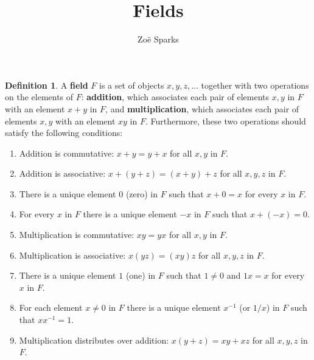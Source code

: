 \documentclass[12pt]{article}
\title{Fields}
\author{Zoë Sparks}
\begin{document}
\theoremstyle{definition}

\newtheorem{thm}{Theorem}
\newtheorem*{nthm}{Theorem}
\newtheorem{sthm}{}[thm]
\newtheorem{lemma}{Lemma}[thm]
\newtheorem*{cor}{Corollary}
\newtheorem*{prop}{Property}
\newtheorem*{defn}{Definition}
\newtheorem*{comm}{Comment}
\newtheorem*{exm}{Example}

\maketitle

\begin{defn}
  A \textbf{field} $F$ is a set of objects $x, y, z, …$ together
  with two operations on the elements of $F$: \textbf{addition},
  which associates each pair of elements $x, y$ in $F$ with an
  element $x + y$ in $F$, and \textbf{multiplication}, which
  associates each pair of elements $x, y$ with an element $xy$ in
  $F$. Furthermore, these two operations should satisfy the
  following conditions:

  \begin{enumerate}
      \item Addition is commutative: $x + y = y + x$ for all $x,
        y$ in $F$.
      \item Addition is associative: $x + (y + z) = (x + y) + z$
        for all $x, y, z$ in $F$.
      \item There is a unique element $0$ (zero) in $F$ such that
        $x + 0 = x$ for every $x$ in $F$.
      \item For every $x$ in $F$ there is a unique element $-x$
        in $F$ such that $x + (-x) = 0$.
      \item Multiplication is commutative: $xy = yx$ for all $x,
        y$ in $F$.
      \item Multiplication is associative: $x(yz) = (xy)z$ for
        all $x, y, z$ in $F$.
      \item There is a unique element $1$ (one) in $F$ such that
        $1 \neq 0$ and $1x = x$ for every $x$ in $F$.
      \item For each element $x \neq 0$ in $F$ there is a unique
        element $x^{-1}$ (or $1/x$) in $F$ such that $xx^{-1} =
        1$.
      \item Multiplication distributes over addition: $x(y + z) =
        xy + xz$ for all $x, y, z$ in $F$.
  \end{enumerate}
\end{defn}
\end{document}
